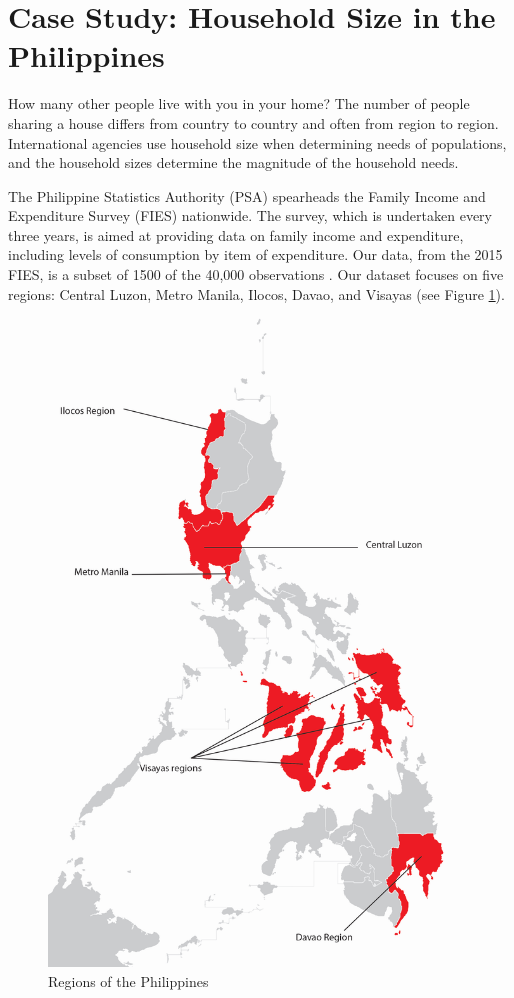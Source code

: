 \documentclass[
]{krantz}
\begin{document}
\hypertarget{cs-philippines}{%
\section{Case Study: Household Size in the Philippines}\label{cs-philippines}}

How many other people live with you in your home? The number of people sharing a house differs from country to country and often from region to region. International agencies use household size when determining needs of populations, and the household sizes determine the magnitude of the household needs.

The Philippine Statistics Authority (PSA) spearheads the Family Income and Expenditure Survey (FIES) nationwide. The survey, which is undertaken every three years, is aimed at providing data on family income and expenditure, including levels of consumption by item of expenditure. Our data, from the 2015 FIES, is a subset of 1500 of the 40,000 observations \citep{PSA}. Our dataset focuses on five regions: Central Luzon, Metro Manila, Ilocos, Davao, and Visayas (see Figure \ref{fig:philippinesmap}).

\begin{figure}
\includegraphics[width=0.5\linewidth]{data/map_of_philippines} \caption{Regions of the Philippines}\label{fig:philippinesmap}
\end{figure}
\end{document}
